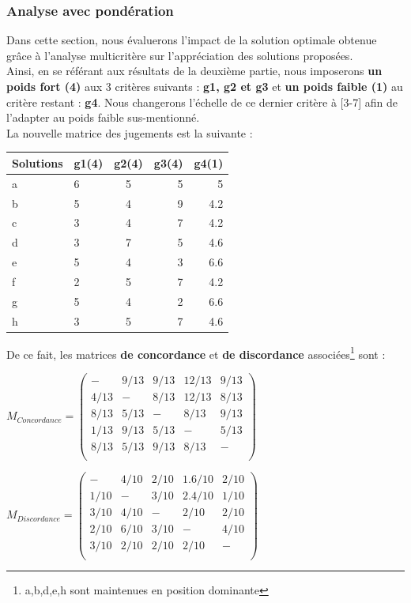 \documentclass[a4paper, 11pt]{article}
\begin{document}
\subsubsection{Analyse avec pondération}
Dans cette section, nous évaluerons l'impact de la solution optimale obtenue grâce à l'analyse multicritère sur l'appréciation des solutions proposées.\\
Ainsi, en se référant aux résultats de la deuxième partie, nous imposerons \textbf{un poids fort (4)} aux 3 critères suivants : \textbf{g1, g2 et g3} et \textbf{un poids faible (1)} au critère restant : \textbf{g4}. Nous changerons l'échelle de ce dernier critère à [3-7] afin de l'adapter au poids faible sus-mentionné.\\
La nouvelle matrice des jugements est la suivante :\\
\begin{table}[H]
\centering
\begin{tabular}{|l|l|c|r|r|}
  \hline
  Solutions & g1(4) & g2(4) & g3(4) & g4(1)\\
  \hline
  a &6 & 5 & 5 & 5 \\
  b &5 & 4 & 9 & 4.2 \\
  c &3 & 4 & 7 & 4.2 \\
  d &3 & 7 & 5 & 4.6 \\
  e &5 & 4 & 3 & 6.6\\
  f &2 & 5 & 7 & 4.2 \\
  g &5 & 4 & 2 & 6.6\\
  h &3 & 5 & 7 & 4.6\\
  \hline
\end{tabular}
\end{table}
De ce fait, les matrices \textbf{de concordance} et \textbf{de discordance} associées\footnote{a,b,d,e,h sont maintenues en position dominante} sont :
\begin{center}
$ M_{Concordance} =\begin{pmatrix}
-&9/13&9/13&12/13&9/13\\
4/13&-&8/13&12/13&8/13\\
8/13&5/13&-&8/13&9/13\\
1/13&9/13&5/13&-&5/13\\
8/13&5/13&9/13&8/13&-\\
\end{pmatrix}$
\end{center}
\begin{center}
$M_{Discordance} =\begin{pmatrix}
-&4/10&2/10&1.6/10&2/10\\
1/10&-&3/10&2.4/10&1/10\\
3/10&4/10&-&2/10&2/10\\
2/10&6/10&3/10&-&4/10\\
3/10&2/10&2/10&2/10&-\\
\end{pmatrix} $\\
\end{center}
\end{document}
